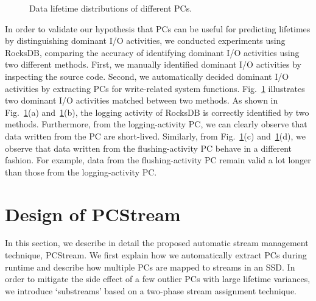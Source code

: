 \begin{figure}[t]
	\hspace{10pt}
\caption{Data lifetime distributions of different PCs.} 
\label{fig:types_and_PCs}
\end{figure}


In order to validate our hypothesis that PCs can be useful for predicting
lifetimes by distinguishing dominant I/O activities, we conducted experiments
using RocksDB, comparing the accuracy of identifying dominant I/O activities
using two different methods.  First, we manually identified dominant I/O
activities by inspecting the source code. Second, we automatically decided
dominant I/O activities by extracting PCs for write-related system functions.
Fig.~\ref{fig:types_and_PCs} illustrates two dominant I/O activities matched
between two methods.   As shown in Fig.~\ref{fig:types_and_PCs}(a)
and~\ref{fig:types_and_PCs}(b), the logging activity of RocksDB is correctly
identified by two methods.  Furthermore, from the logging-activity PC, we can
clearly observe that data written from the PC are short-lived. Similarly,
from Fig.~\ref{fig:types_and_PCs}(c) and~\ref{fig:types_and_PCs}(d), we observe
that data written from the flushing-activity PC behave in a different fashion.
For example, data from the flushing-activity PC remain valid a lot longer than
those from the logging-activity PC.

\section{Design of \textsf{PCStream}}
In this section, we describe in detail the proposed automatic stream management technique, %
\textsf{\small PCStream}.  We first explain how we automatically extract PCs during
runtime and describe how multiple PCs are mapped to streams in an SSD.
In order to mitigate the side effect of a few outlier PCs with large lifetime variances, 
we introduce `substreams' based on a two-phase
stream assignment technique.


